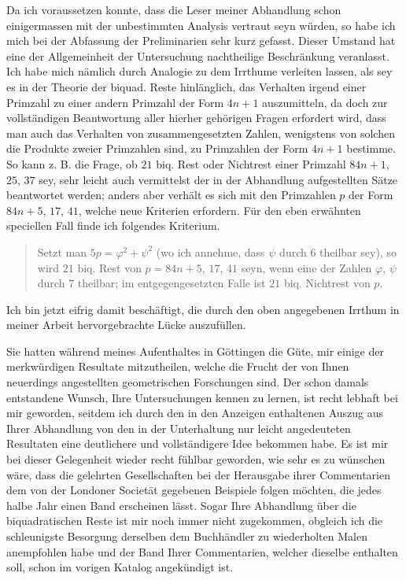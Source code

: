\documentclass[11pt]{article}
\begin{document}
Da ich voraussetzen konnte, dass die Leser meiner Abhandlung schon einigermassen mit der unbestimmten Analysis vertraut seyn würden, so habe ich mich bei der Abfassung der Preliminarien sehr kurz gefasst. Dieser Umstand hat eine der Allgemeinheit der Untersuchung nachtheilige Beschränkung veranlasst. Ich habe mich nämlich durch Analogie zu dem Irrthume verleiten lassen, als sey es in der Theorie der biquad. Reste hinlänglich, das Verhalten irgend einer Primzahl zu einer andern Primzahl der Form $4n+1$ auszumitteln, da doch zur vollständigen Beantwortung aller hierher gehörigen Fragen erfordert wird, dass man auch das Verhalten von zusammengesetzten Zahlen, wenigstens von solchen die Produkte zweier Primzahlen sind, zu Primzahlen der Form $4n+1$ bestimme. So kann z. B. die Frage, ob $21$ biq. Rest oder Nichtrest einer Primzahl $84n+1$, $25$, $37$ sey, sehr leicht auch vermittelst der in der Abhandlung aufgestellten Sätze beantwortet werden; anders aber verhält es sich mit den Primzahlen $p$ der Form $84n+5$, $17$, $41$, welche neue Kriterien erfordern. Für den eben erwähnten speciellen Fall finde ich folgendes Kriterium.

\begin{quote}
Setzt man $5p=\varphi^2+\psi^2$ (wo ich annehme, dass $\psi$ durch $6$ theilbar sey), so wird $21$ biq. Rest von $p=84n+5$, $17$, $41$ seyn, wenn eine der Zahlen $\varphi$, $\psi$ durch $7$ theilbar; im entgegengesetzten Falle ist $21$ biq. Nichtrest von $p$.
\end{quote}

Ich bin jetzt eifrig damit beschäftigt, die durch den oben angegebenen Irrthum in meiner Arbeit hervorgebrachte Lücke auszufüllen.

Sie hatten während meines Aufenthaltes in Göttingen die Güte, mir einige der merkwürdigen Resultate mitzutheilen, welche die Frucht der von Ihnen neuerdings angestellten geometrischen Forschungen sind. Der schon damals entstandene Wunsch, Ihre Untersuchungen kennen zu lernen, ist recht lebhaft bei mir geworden, seitdem ich durch den in den Anzeigen enthaltenen Auszug aus Ihrer Abhandlung von den in der Unterhaltung nur leicht angedeuteten Resultaten eine deutlichere und vollständigere Idee bekommen habe. Es ist mir bei dieser Gelegenheit wieder recht fühlbar geworden, wie sehr es zu wünschen wäre, dass die gelehrten Gesellschaften bei der Herausgabe ihrer Commentarien dem von der Londoner Societät gegebenen Beispiele folgen möchten, die jedes halbe Jahr einen Band erscheinen lässt. Sogar Ihre Abhandlung über die biquadratischen Reste ist mir noch immer nicht zugekommen, obgleich ich die schleunigste Besorgung derselben dem Buchhändler zu wiederholten Malen anempfohlen habe und der Band Ihrer Commentarien, welcher dieselbe enthalten soll, schon im vorigen Katalog angekündigt ist.
\end{document}
